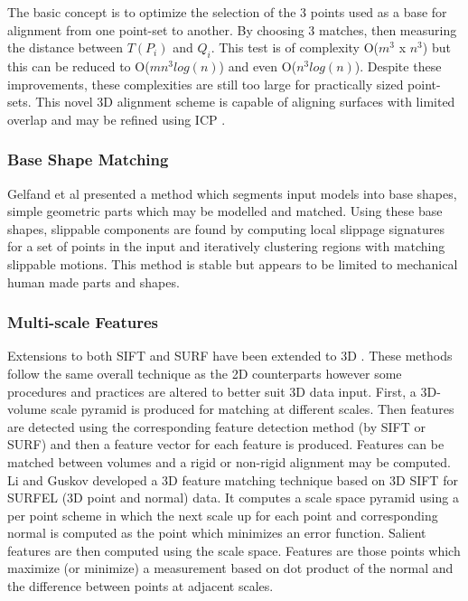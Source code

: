 The basic concept is to optimize the selection of the 3 points used as a base for alignment from one point-set to another. By choosing 3 matches, then measuring the distance between $T(P_i)$ and $Q_i$. This test is of complexity  O($m^3$ x $n^3$) but this can be reduced to  O($mn^3 log(n)$) \cite{Irani96Combinatorial} and even O($n^3 log(n)$). Despite these improvements, these complexities are still too large for practically sized point-sets. This novel 3D alignment scheme is capable of aligning surfaces with limited overlap and may be refined using ICP \cite{Rusinkiewicz01Efficient}. \\


\subsubsection{Base Shape Matching}

Gelfand et al \cite{Gelfand04Shape} presented a method which segments input models into base shapes, simple geometric parts which may be modelled and matched. Using these base shapes, slippable components are found by computing local slippage signatures for a set of points in the input and iteratively clustering regions with matching slippable motions. This method is stable but appears to be limited to mechanical human made parts and shapes.

\subsubsection{Multi-scale Features}

Extensions to both SIFT and SURF have been extended to 3D \cite{Scovanner073Dimensional,Flitton10Object}. These methods follow the same overall technique as the 2D counterparts however some procedures and practices are altered to better suit 3D data input. First, a 3D-volume scale pyramid is produced for matching at different scales. Then features are detected using the corresponding feature detection method (by SIFT or SURF) and then a feature vector for each feature is produced. Features can be matched between volumes and a rigid or non-rigid alignment may be computed. \\

Li and Guskov \cite{Li05Multiscale} developed a 3D feature matching technique based on 3D SIFT for SURFEL (3D point and normal) data. It computes a scale space pyramid using a per point scheme in which the next scale up for each point and corresponding normal is computed as the point which minimizes an error function. Salient features are then computed using the scale space. Features are those points which maximize (or minimize) a measurement based on dot product of the normal and the difference between points at adjacent scales. \\

